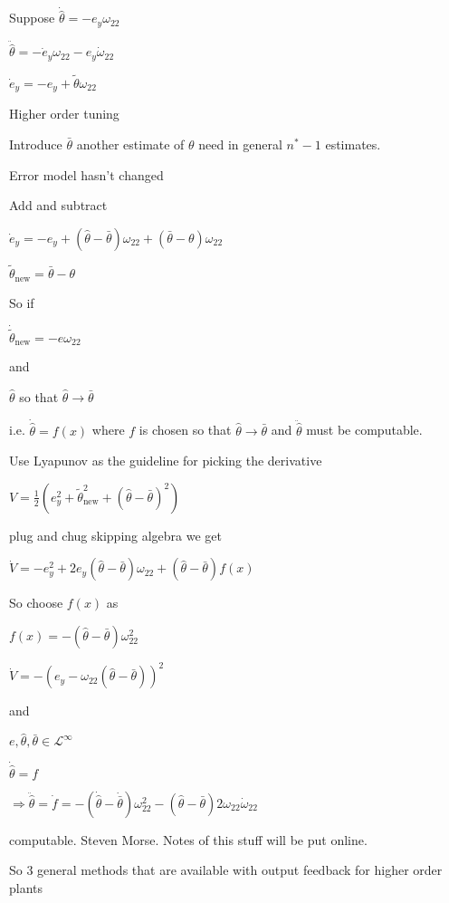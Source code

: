 Suppose $\dot{\hat{\theta}}=-e_{y}\omega_{22}$

$\ddot{\hat{\theta}}=-\dot{e}_{y}\omega_{22}-e_{y}\dot{\omega}_{22}$

$\dot{e}_{y}=-e_{y}+\tilde{\theta}\omega_{22}$

Higher order tuning

Introduce $\bar{\theta}$ another estimate of $\theta$ need in general $n^{*}-1$ estimates.

Error model hasn't changed

Add and subtract

$\dot{e}_{y}=-e_{y}+(\hat{\theta}-\bar{\theta})\omega_{22}+(\bar{\theta}-\theta)\omega_{22}$

$\tilde{\theta}_{\text{new}}=\bar{\theta}-\theta$

So if

$\dot{\tilde{\theta}}_{\text{new}}=-e\omega_{22}$

and

$\hat{\theta}$ so that $\hat{\theta}\rightarrow\bar{\theta}$

i.e.
$\dot{\hat{\theta}}=f(x)$ where $f$ is chosen so that $\hat{\theta}\rightarrow\bar{\theta}$ and $\ddot{\hat{\theta}}$ must be computable.

Use Lyapunov as the guideline for picking the derivative

$V=\frac{1}{2}(e_{y}^{2}+\tilde{\theta}_{\text{new}}^{2}+(\hat{\theta}-\bar{\theta})^{2})$

plug and chug skipping algebra we get

$\dot{V}=-e_{y}^{2}+2e_{y}(\hat{\theta}-\bar{\theta})\omega_{22}+(\hat{\theta}-\bar{\theta})f(x)$

So choose $f(x)$ as

$f(x)=-(\hat{\theta}-\bar{\theta})\omega_{22}^{2}$

$\dot{V}=-(e_{y}-\omega_{22}(\hat{\theta}-\bar{\theta}))^{2}$

and

$e,\hat{\theta},\bar{\theta}\in\mathcal{L}^{\infty}$

$\dot{\hat{\theta}}=f$

$\Rightarrow\ddot{\hat{\theta}}=\dot{f}=-(\dot{\hat{\theta}}-\dot{\bar{\theta}})\omega_{22}^{2}-(\hat{\theta}-\bar{\theta})2\omega_{22}\dot{\omega}_{22}$

computable.
Steven Morse.
Notes of this stuff will be put online.

So 3 general methods that are available with output feedback for higher order plants

